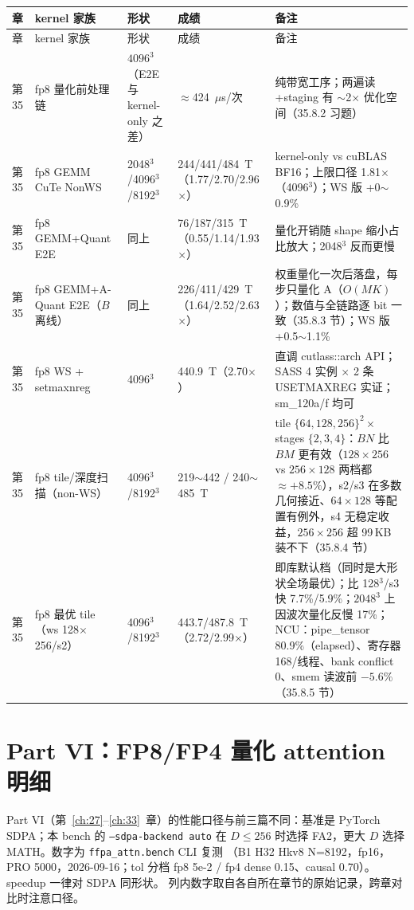 \begingroup\small
\begin{longtable}{p{1.6cm}p{3.4cm}p{2.4cm}p{3.2cm}p{3.0cm}}
\toprule
章 & kernel 家族 & 形状 & 成绩 & 备注 \\
\midrule
\endfirsthead
\toprule
章 & kernel 家族 & 形状 & 成绩 & 备注 \\
\midrule
\endhead
\endfoot
\bottomrule
\endlastfoot
第35 & fp8 量化前处理链 & $4096^3$（E2E 与 kernel-only 之差） & $\approx$424~$\mu$s/次 & 纯带宽工序；两遍读+staging 有 $\sim$2$\times$ 优化空间（35.8.2 习题） \\
第35 & fp8 GEMM CuTe NonWS & 2048$^3$/4096$^3$/8192$^3$ & 244/441/484~T（1.77/2.70/2.96$\times$） & kernel-only vs cuBLAS BF16；上限口径 1.81$\times$（4096$^3$）；WS 版 +0$\sim$0.9\% \\
第35 & fp8 GEMM+Quant E2E & 同上 & 76/187/315~T（0.55/1.14/1.93$\times$） & 量化开销随 shape 缩小占比放大；2048$^3$ 反而更慢 \\
第35 & fp8 GEMM+A-Quant E2E（$B$ 离线） & 同上 & 226/411/429~T（1.64/2.52/2.63$\times$） & 权重量化一次后落盘，每步只量化 A（$O(MK)$）；数值与全链路逐 bit 一致（35.8.3 节）；WS 版 +0.5$\sim$1.1\% \\
第35 & fp8 WS + setmaxnreg & 4096$^3$ & 440.9~T（2.70$\times$） & 直调 cutlass::arch API；SASS 4 实例 $\times$ 2 条 USETMAXREG 实证；sm\_120a/f 均可 \\
第35 & fp8 tile/深度扫描（non-WS） & 4096$^3$/8192$^3$ & 219$\sim$442 / 240$\sim$485~T & tile $\{64,128,256\}^2\times$ stages $\{2,3,4\}$：$BN$ 比 $BM$ 更有效（$128\times256$ vs $256\times128$ 两档都 $\approx+8.5\%$），s2/s3 在多数几何接近、$64\times128$ 等配置有例外，s4 无稳定收益，$256\times256$ 超 99\,KB 装不下（35.8.4 节）\\
第35 & fp8 最优 tile（ws 128$\times$256/s2） & 4096$^3$/8192$^3$ & 443.7/487.8~T（2.72/2.99$\times$） & 即库默认档（同时是大形状全场最优）；比 128$^3$/s3 快 7.7\%/5.9\%；$2048^3$ 上因波次量化反慢 17\%；NCU：pipe\_tensor 80.9\%（elapsed）、寄存器 168/线程、bank conflict 0、smem 读波前 $-5.6\%$（35.8.5 节） \\
\end{longtable}
\endgroup

\section{Part VI：FP8/FP4 量化 attention 明细}

Part VI（第~\ref{ch:27}--\ref{ch:33}~章）的性能口径与前三篇不同：基准是
PyTorch SDPA；本 bench 的 \texttt{--sdpa-backend auto} 在 $D\le256$ 时选择
FA2，更大 $D$ 选择 MATH。数字为 \texttt{ffpa\_attn.bench} CLI 复测
（B1 H32 Hkv8 N=8192，fp16，PRO 5000，2026-09-16；tol 分档
fp8 5e-2 / fp4 dense 0.15、causal 0.70）。speedup 一律对 SDPA 同形状。
列内数字取自各自所在章节的原始记录，跨章对比时注意口径。


